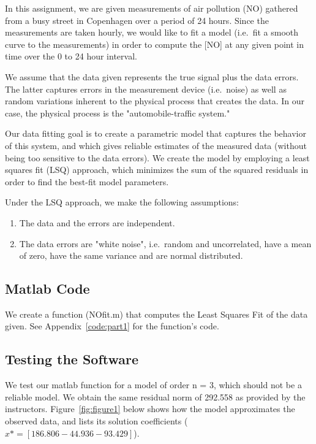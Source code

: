 In this assignment, we are given measurements of air pollution (NO) gathered from a busy street in Copenhagen over a period of 24 hours. Since the measurements are taken hourly, we would like to fit a model (i.e.\ fit a smooth curve to the measurements) in order to compute the [NO] at any given point in time over the 0 to 24 hour interval. 

We assume that the data given represents the true signal plus the data errors. The latter captures errors in the measurement device (i.e.\ noise) as well as random variations inherent to the physical process that creates the data. In our case, the physical process is the "automobile-traffic system." 

Our data fitting goal is to create a parametric model that captures the behavior of this system, and which gives reliable estimates of the measured data (without being too sensitive to the data errors). We create the model by employing a least squares fit (LSQ) approach, which minimizes the sum of the squared residuals in order to find the best-fit model parameters.  

Under the LSQ approach, we make the following assumptions:

\begin{enumerate}[label={\bf Assumption~\arabic*},leftmargin=*]
\item The data and the errors are independent.

\item The data errors are "white noise", i.e.\ random and uncorrelated, have a mean of zero, have the same variance and are normal distributed.
\end{enumerate}
           
             
\subsection{Matlab Code}
We create a function (NOfit.m) that computes the Least Squares Fit of the data given. See Appendix~\ref{code:part1} for the function's code.   

\subsection{Testing the Software}
We test our matlab function for a model of order n = 3, which should not be a reliable model. We obtain the same residual norm of 292.558 as provided by the instructors. Figure~\ref{fig:figure1} below shows how the model approximates the observed data, and lists its solution coefficients ($x* = [186.806 -44.936 -93.429]$).

